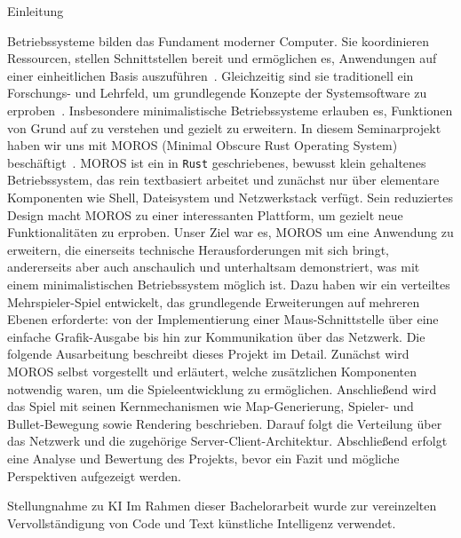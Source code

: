 \begin{section}{Einleitung}

Betriebssysteme bilden das Fundament moderner Computer.
Sie koordinieren Ressourcen, stellen Schnittstellen bereit und ermöglichen es, Anwendungen auf einer
einheitlichen Basis auszuführen~\cite{tanenbaum2015modern}.
Gleichzeitig sind sie traditionell ein Forschungs- und Lehrfeld, um grundlegende Konzepte der Systemsoftware zu erproben~\cite{osdev_wiki, hobby_os_wiki}.
Insbesondere minimalistische Betriebssysteme erlauben es, Funktionen von Grund auf zu verstehen und gezielt zu erweitern.
In diesem Seminarprojekt haben wir uns mit MOROS (Minimal Obscure Rust Operating System) beschäftigt~\cite{moros_github}.
MOROS ist ein in \texttt{Rust} geschriebenes, bewusst
klein gehaltenes Betriebssystem, das rein textbasiert arbeitet und zunächst nur über elementare Komponenten wie Shell, Dateisystem und Netzwerkstack verfügt.
Sein reduziertes Design macht MOROS zu einer interessanten Plattform, um gezielt neue Funktionalitäten zu erproben.
Unser Ziel war es, MOROS um eine Anwendung zu erweitern, die einerseits technische Herausforderungen mit sich bringt, andererseits aber auch anschaulich und
unterhaltsam demonstriert, was mit einem minimalistischen Betriebssystem möglich ist.
Dazu haben wir ein verteiltes Mehrspieler-Spiel entwickelt, das grundlegende
Erweiterungen auf mehreren Ebenen erforderte: von der Implementierung einer Maus-Schnittstelle über eine einfache Grafik-Ausgabe bis hin zur Kommunikation über
das Netzwerk.
Die folgende Ausarbeitung beschreibt dieses Projekt im Detail.
Zunächst wird MOROS selbst vorgestellt und erläutert, welche zusätzlichen Komponenten notwendig
waren, um die Spieleentwicklung zu ermöglichen.
Anschließend wird das Spiel mit seinen Kernmechanismen wie Map-Generierung, Spieler- und Bullet-Bewegung
sowie Rendering beschrieben.
Darauf folgt die Verteilung über das Netzwerk und die zugehörige Server-Client-Architektur.
Abschließend erfolgt eine Analyse und
Bewertung des Projekts, bevor ein Fazit und mögliche Perspektiven aufgezeigt werden.

\begin{subsection}{Stellungnahme zu KI}\label{sec:KI}
Im Rahmen dieser Bachelorarbeit wurde zur vereinzelten Vervollständigung von Code und Text künstliche Intelligenz verwendet.
\end{subsection}


\end{section}